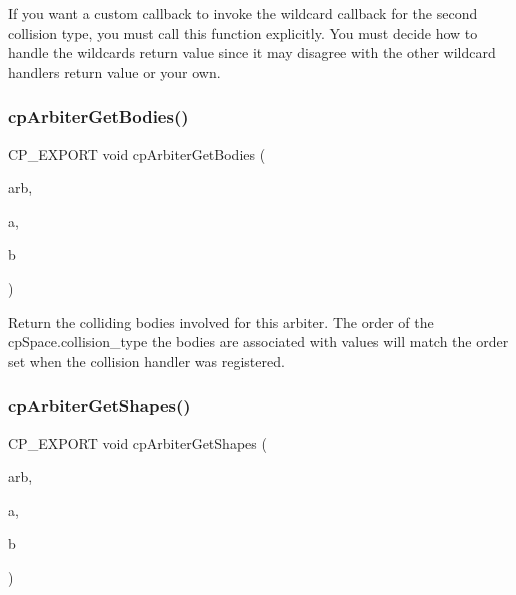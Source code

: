 If you want a custom callback to invoke the wildcard callback for the second collision type, you must call this function explicitly. You must decide how to handle the wildcard\textquotesingle{}s return value since it may disagree with the other wildcard handler\textquotesingle{}s return value or your own. \mbox{\label{group__cpArbiter_gac5371d101c55a8a9c5b471e12010a8b3}} 
\subsubsection{\texorpdfstring{cp\+Arbiter\+Get\+Bodies()}{cpArbiterGetBodies()}}
{\footnotesize\ttfamily C\+P\+\_\+\+E\+X\+P\+O\+RT void cp\+Arbiter\+Get\+Bodies (\begin{DoxyParamCaption}\item[{const \hyperlink{structcpArbiter}{cp\+Arbiter} $\ast$}]{arb,  }\item[{\hyperlink{structcpBody}{cp\+Body} $\ast$$\ast$}]{a,  }\item[{\hyperlink{structcpBody}{cp\+Body} $\ast$$\ast$}]{b }\end{DoxyParamCaption})}

Return the colliding bodies involved for this arbiter. The order of the cp\+Space.\+collision\+\_\+type the bodies are associated with values will match the order set when the collision handler was registered. \mbox{\label{group__cpArbiter_ga521ac495c53bf25ab061a79643bb195a}} 
\subsubsection{\texorpdfstring{cp\+Arbiter\+Get\+Shapes()}{cpArbiterGetShapes()}}
{\footnotesize\ttfamily C\+P\+\_\+\+E\+X\+P\+O\+RT void cp\+Arbiter\+Get\+Shapes (\begin{DoxyParamCaption}\item[{const \hyperlink{structcpArbiter}{cp\+Arbiter} $\ast$}]{arb,  }\item[{\hyperlink{structcpShape}{cp\+Shape} $\ast$$\ast$}]{a,  }\item[{\hyperlink{structcpShape}{cp\+Shape} $\ast$$\ast$}]{b }\end{DoxyParamCaption})}

